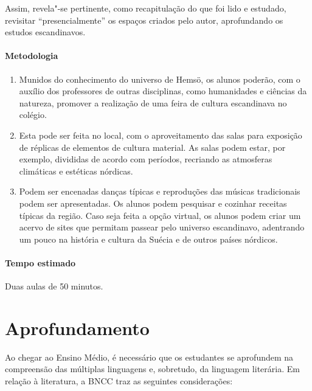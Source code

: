 \documentclass[12pt]{extarticle}
\begin{document}
Assim, revela"-se pertinente, como recapitulação do que foi lido e estudado, revisitar ``presencialmente'' os espaços 
criados pelo autor, aprofundando os estudos escandinavos. 

\paragraph{Metodologia}

\begin{enumerate}

\item
Munidos do conhecimento do universo de Hemsö, os alunos
poderão, com o auxílio dos professores de outras disciplinas, como humanidades e ciências da natureza, 
promover a realização de uma feira de cultura escandinava no colégio. 

\item
Esta pode ser feita no local, com o aproveitamento das salas para exposição 
de réplicas de elementos de cultura material. As salas podem estar, por exemplo, 
divididas de acordo com períodos, recriando as atmosferas climáticas e estéticas nórdicas. 

\item
Podem ser encenadas danças típicas e reproduções das músicas tradicionais podem ser apresentadas. 
Os alunos podem pesquisar e cozinhar receitas típicas da região. 
Caso seja feita a opção virtual, os alunos podem criar um acervo de sites 
que permitam passear pelo universo escandinavo, adentrando um pouco na história e cultura da
Suécia e de outros países nórdicos.

\end{enumerate}

\paragraph{Tempo estimado} Duas aulas de 50 minutos.


\section{Aprofundamento}

Ao chegar ao Ensino Médio, é necessário que os estudantes se aprofundem
na compreensão das múltiplas linguagens e, sobretudo, da linguagem
literária. Em relação à literatura, a BNCC traz as seguintes
considerações:
\end{document}
